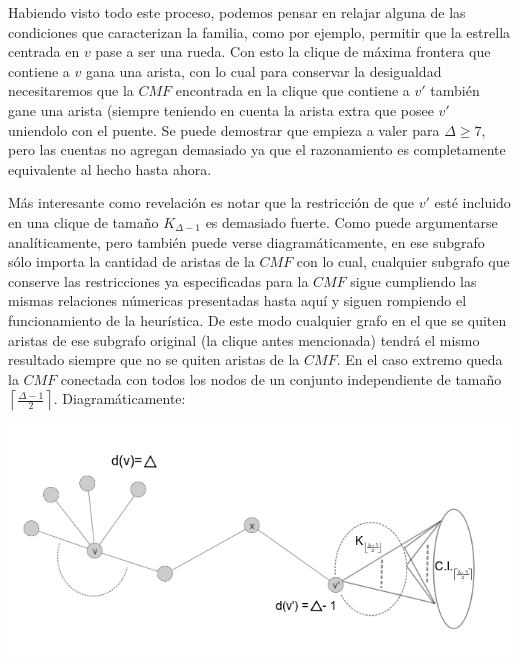 \phantom{x}


Habiendo visto todo este proceso, podemos pensar en relajar alguna de las condiciones que 
caracterizan la familia, como por ejemplo, permitir que la estrella centrada en $v$ pase
a ser una rueda. Con esto la clique de m\'axima frontera que contiene a $v$ gana una arista, 
con lo cual para conservar la desigualdad necesitaremos que la $CMF$ encontrada
en la clique que contiene a $v'$ tambi\'en gane una arista (siempre teniendo en cuenta la
arista extra que posee $v'$ uniendolo con el puente. Se puede demostrar que empieza a
valer para $\Delta \geq 7$, pero las cuentas no agregan demasiado ya que el razonamiento
es completamente equivalente al hecho hasta ahora.

	
M\'as interesante como revelaci\'on es notar que la restricci\'on de que $v'$ est\'e
incluido en una clique de tama\~no $K_{\Delta -1}$ es demasiado fuerte. Como puede argumentarse
anal\'iticamente, pero tambi\'en puede verse diagram\'aticamente, en ese subgrafo s\'olo importa 
la cantidad de aristas de la $CMF$ con lo cual, cualquier subgrafo que conserve las restricciones
ya especificadas para la $CMF$ sigue cumpliendo las mismas relaciones n\'umericas presentadas
hasta aqu\'i y siguen rompiendo el funcionamiento de la heur\'istica. De este modo 
cualquier grafo en el que se quiten aristas de ese subgrafo original (la clique antes mencionada)
tendr\'a el mismo resultado siempre que no se quiten aristas de la $CMF$. En el caso extremo queda
la $CMF$ conectada con todos los nodos de un conjunto independiente de tama\~no 
$\left\lceil \frac{\Delta -1}{2} \right\rceil$. Diagram\'aticamente:

\begin{center} 
	\includegraphics[scale = 0.8]{img/ej3/constructiva_golosa/vnotincmf_carac2.png} 
\end{center}
